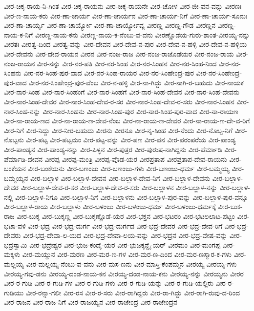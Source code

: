 ವೀರ-ಚಿಕ್ಕ-ರಾಯ-ನಿ-ಗಿಂತ
ವೀರ-ಚಿಕ್ಕ-ರಾಯನು
ವೀರ-ಚಿಕ್ಕ-ರಾಯನೇ
ವೀರ-ಚೋಳ
ವೀರ-ಜೀ-ವನ-ವನ್ನು
ವೀರಣಃ
ವೀರ-ಣ-ನಾಯ-ಕರು
ವೀರ-ಣಾ-ಚಾರ್ಯ
ವೀರ-ಣಾ-ಚಾರ್ಯನ
ವೀರ-ಣಾ-ಚಾರ್ಯ-ನಿಗೆ
ವೀರ-ಣಾ-ಚಾರ್ಯ-ಸೂನುಃ
ವೀರ-ಣಾ-ಚಾರ್ಯ್ಯ
ವೀರ-ಣಾ-ಚಾರ್ಯ್ಯೋ
ವೀರ-ಣಾ-ಚಾರ್ಯ್ಯೋವ್ಯ
ವೀರಣ್ಣ
ವೀರಣ್ಣ-ಗೌಡ
ವೀರಣ್ಣನ
ವೀರಣ್ಣ-ನಾಯ-ಕ-ನಿಗೆ
ವೀರಣ್ಣ-ನಾಯ-ಕನು
ವೀರಣ್ಣ-ನಾಯ-ಕ-ನೆಂಬು-ವ-ವನು
ವೀರಣ್ಣೊಡೆಯ-ಗುರು-ಶಾಂತ-ವೀರಯ್ಯ-ನನ್ನು
ವೀರತಃ
ವೀರತ್ವ-ದಿಂದ
ವೀರತ್ವ-ವನ್ನು
ವೀರ-ದೇವನ
ವೀರ-ದೇವ-ನ-ಪುರ
ವೀರ-ದೇವ-ನ-ಹಳ್ಳಿ
ವೀರ-ದೇವ-ನ-ಹಳ್ಳಿಯ
ವೀರ-ದೇವನು
ವೀರ-ದೇವ-ರಾಯನ
ವೀರನ
ವೀರ-ನಂಜ-ರಾಜ
ವೀರ-ನಂಜ-ರಾಜೊಡೆಯರ
ವೀರ-ನಂಜ-ರಾಯ
ವೀರ-ನಂಜ-ರಾಯನ
ವೀರ-ನನ್ನು
ವೀರ-ನರ-ಪತಿ
ವೀರ-ನರ-ಸಿಂಹ
ವೀರ-ನರ-ಸಿಂಹನ
ವೀರ-ನರ-ಸಿಂಹ-ನಿಂದ
ವೀರ-ನರ-ಸಿಂಹನು
ವೀರ-ನರ-ಸಿಂಹ-ಪುರ-ವಾದ
ವೀರ-ನರ-ಸಿಂಹ-ರಾಯರ
ವೀರ-ನರ-ಸಿಂಹೇಂದ್ರ-ಪುರ
ವೀರ-ನರ-ಸಿಂಹೇಂದ್ರ-ಪುರ-ವಾದ
ವೀರ-ನರ-ಸಿಂಹೇಂದ್ರ-ಪುರ-ವೆಂಬ
ವೀರ-ನ-ಹಳ್ಳಿ
ವೀರ-ನಾ-ಗಿದ್ದು
ವೀರ-ನಾಗಿ-ರ-ಬಹುದು
ವೀರ-ನಾಯಕ
ವೀರ-ನಾರ-ಸಿಂಹ
ವೀರ-ನಾರ-ಸಿಂಹಂಗೆ
ವೀರ-ನಾರ-ಸಿಂಹಗೆ
ವೀರ-ನಾರ-ಸಿಂಹ-ದೇವನ
ವೀರ-ನಾರ-ಸಿಂಹ-ದೇವನು
ವೀರ-ನಾರ-ಸಿಂಹ-ದೇವರ
ವೀರ-ನಾರ-ಸಿಂಹ-ದೇವ-ರ-ಸರ
ವೀರ-ನಾರ-ಸಿಂಹ-ದೇವ-ರ-ಸರು
ವೀರ-ನಾರ-ಸಿಂಹನ
ವೀರ-ನಾರ-ಸಿಂಹ-ನನ್ನು
ವೀರ-ನಾರ-ಸಿಂಹನು
ವೀರ-ನಾರ-ಸಿಂಹ-ಪುರ
ವೀರ-ನಾರ-ಸಿಂಹ-ಪುರ-ವಾದ
ವೀರ-ನಾ-ರಾಯಣ
ವೀರ-ನಾ-ರಾಯ-ಣದ
ವೀರ-ನಾ-ರಾಯ-ಣ-ದೇವ-ನೆಂಬ
ವೀರ-ನಾ-ರಾಯ-ಣ-ದೇವರ
ವೀರ-ನಾ-ರಾಯ-ಣ-ದೇ-ವ-ರಿಗೆ
ವೀರ-ನಿಗೆ
ವೀರ-ನಿದ್ದು
ವೀರ-ನೀರ-ಬಹುದು
ವೀರನು
ವೀರನೂ
ವೀರ-ನೃ-ಸಿಂಹ
ವೀರ-ನೆಂದು
ವೀರ-ನೊಬ್ಬ-ನಿಗೆ
ವೀರ-ನೊಬ್ಬನು
ವೀರ-ಪಟ್ಟ
ವೀರ-ಪಟ್ಟಮಂ
ವೀರ-ಪಟ್ಟ-ವನ್ನು
ವೀರ-ಪಣ
ವೀರ-ಪನ
ವೀರ-ಪರಂಪರೆಯ
ವೀರ-ಪಾಂಡ್ಯ
ವೀರ-ಪಾಂಡ್ಯನ
ವೀರ-ಪಾಂಡ್ಯ-ನನ್ನು
ವೀರ-ಪಿಳ್ಳನ
ವೀರ-ಪುತ್ರರ
ವೀರ-ಪುರುಷ-ನಾಗಿದ್ದನು
ವೀರ-ಪೆರ್ಮಾಡಿ
ವೀರ-ಪೆರ್ಮಾಡಿ-ದೇವನ
ವೀರಪ್ಪ
ವೀರಪ್ಪ-ಮಂತ್ರಿ
ವೀರಪ್ಪ-ವೊಡ-ಯರ
ವೀರಪ್ರತಾಪ
ವೀರಪ್ರತಾಪ-ದೇವ-ರಾಯನು
ವೀರ-ಬಂಕೆಯನ
ವೀರ-ಬಂಕೆಯನು
ವೀರ-ಬಣಂಜು
ವೀರ-ಬಣಂಜು-ಗಳು
ವೀರ-ಬಣಂಜು-ಧರ್ಮ
ವೀರ-ಬಮ್ಮಯ್ಯ
ವೀರ-ಬಮ್ಮಯ್ಯನ
ವೀರ-ಬಲ್ಲಾಳ
ವೀರ-ಬಲ್ಲಾಳ-ದೇವನ
ವೀರ-ಬಲ್ಲಾಳ-ದೇವ-ನಿಗೆ
ವೀರ-ಬಲ್ಲಾಳ-ದೇವನು
ವೀರ-ಬಲ್ಲಾಳ-ದೇವರ
ವೀರ-ಬಲ್ಲಾಳ-ದೇವ-ರ-ಸರ
ವೀರ-ಬಲ್ಲಾಳ-ದೇವ-ರ-ಸರು
ವೀರ-ಬಲ್ಲಾಳನ
ವೀರ-ಬಲ್ಲಾಳ-ನನ್ನು
ವೀರ-ಬಲ್ಲಾಳ-ನಲ್ಲಿ
ವೀರ-ಬಲ್ಲಾಳ-ನಿಗೂ
ವೀರ-ಬಲ್ಲಾಳ-ನಿಗೆ
ವೀರ-ಬಲ್ಲಾಳನು
ವೀರ-ಬಲ್ಲಾಳ-ಪುರ-ವನ್ನು
ವೀರ-ಬಲ್ಲಾಳ-ಪುರ-ವನ್ನೂ
ವೀರ-ಬಲ್ಲಾಳ-ರಾಯ
ವೀರ-ಬಲ್ಲಾಳು
ವೀರ-ಬಳಂಜು
ವೀರ-ಬಳಂಜು-ಧರ್ಮ
ವೀರ-ಬಳಂಜು-ಧರ್ಮಕ್ಕೆ
ವೀರ-ಬುಕ-ರಾಜ
ವೀರ-ಬುಕ್ಕ
ವೀರ-ಬುಕ್ಕಣ್ಣ
ವೀರ-ಬುಕ್ಕಣ್ಣೊಡೆ-ಯರ
ವೀರ-ಭಕ್ತನ
ವೀರ-ಭಟರಂ
ವೀರ-ಭಟಲಲಾಟ-ಪಟ್ಟಂ
ವೀರ-ಭಟಾ-ವಳಿ
ವೀರ-ಭದ್ರ
ವೀರ-ಭದ್ರ-ದುರ್ಗ
ವೀರ-ಭದ್ರ-ದುರ್ಗದ
ವೀರ-ಭದ್ರ-ದೇವರ
ವೀರ-ಭದ್ರ-ದೇವ-ರಿಗೆ
ವೀರ-ಭದ್ರ-ದೇವರು
ವೀರ-ಭದ್ರ-ದೇವಾ-ಲ-ಯದ
ವೀರ-ಭದ್ರ-ದೇವಾ-ಲಯ-ವನ್ನು
ವೀರ-ಭದ್ರನ
ವೀರ-ಭದ್ರ-ವೇಷ-ವನ್ನು
ವೀರ-ಭದ್ರಸ್ವಾಮಿ
ವೀರ-ಭದ್ರೇಶ್ವರ
ವೀರ-ಭುಜ-ಕಂದೈ-ಯರ
ವೀರ-ಭುಜಕ್ಕನ್ದೈ-ಯರ್
ವೀರಮಂ
ವೀರ-ಮಂಗಪ್ಪ
ವೀರ-ಮಕ್ಕಳು
ವೀರ-ಮಯ್ದುನ
ವೀರ-ಮರಣ
ವೀರ-ಮರ-ಣ-ಗಳ
ವೀರ-ಮರ-ಣ-ದಿಂದ
ವೀರ-ಮರ-ಣಸ್ಮಾರ-ಕ-ಗಳು
ವೀರ-ಮಲ್ಲಯ್ಯ
ವೀರ-ಮಲ್ಲಯ್ಯ-ನೆಂಬು-ವ-ವನು
ವೀರ-ಮಸ-ಣನು
ವೀರ-ಮಾಸ್ತಿ-ಕೆಂಪಮ್ಮನ
ವೀರಯ್ಯ
ವೀರಯ್ಯ-ಗಳು
ವೀರಯ್ಯ-ಗವು-ಡನು
ವೀರಯ್ಯ-ದಂಡ-ನಾಯ-ಕನ
ವೀರಯ್ಯ-ದಂಡ-ನಾಯ-ಕನು
ವೀರಯ್ಯ-ನನ್ನು
ವೀರಯ್ಯನು
ವೀರರ
ವೀರ-ರ-ಗುಡಿ
ವೀರ-ರ-ಗುಡಿ-ಗಳ
ವೀರ-ರ-ಗುಡಿ-ಗಳು
ವೀರ-ರ-ಗುಡಿ-ಯನ್ನು
ವೀರ-ರ-ಗುಡಿ-ಯಲ್ಲಿರು
ವೀರ-ರ-ಗುಡಿಯು
ವೀರ-ರನ್ನಾ-ಗಲೀ
ವೀರ-ರಸ
ವೀರ-ರ-ಸರು
ವೀರ-ರಾಗಿದ್ದರು
ವೀರ-ರಾ-ಗಿದ್ದು
ವೀರ-ರಾಗಿ-ರುವು-ದ-ರಿಂದ
ವೀರ-ರಾಜನ
ವೀರ-ರಾಜ-ನಿಗೆ
ವೀರ-ರಾಜಯ್ಯನ
ವೀರ-ರಾಜೇಂದ್ರ
ವೀರ-ರಾಜೇಂದ್ರನ
